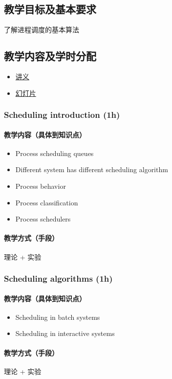 \documentclass[11pt]{article}
\begin{document}
\subsection{教学目标及基本要求}
\label{sec-4-1}
了解进程调度的基本算法
\subsection{教学内容及学时分配}
\label{sec-4-2}
\begin{itemize}
\item \href{./slides/cpu-sched-a.pdf}{讲义}
\item \href{./slides/cpu-sched-b.pdf}{幻灯片}
\end{itemize}
\subsubsection{Scheduling introduction (1h)}
\label{sec-4-2-1}
\paragraph{教学内容（具体到知识点）}
\label{sec-4-2-1-1}
\begin{itemize}
\item Process scheduling queues
\item Different system has different scheduling algorithm
\item Process behavior
\item Process classification
\item Process schedulers
\end{itemize}
\paragraph{教学方式（手段）}
\label{sec-4-2-1-2}
理论 + 实验
\subsubsection{Scheduling algorithms (1h)}
\label{sec-4-2-2}
\paragraph{教学内容（具体到知识点）}
\label{sec-4-2-2-1}
\begin{itemize}
\item Scheduling in batch systems
\item Scheduling in interactive systems
\end{itemize}
\paragraph{教学方式（手段）}
\label{sec-4-2-2-2}
理论 + 实验
\end{document}
